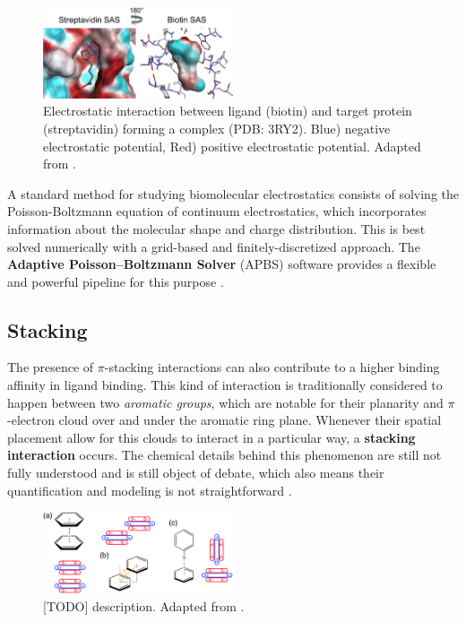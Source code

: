     \begin{figure}[H]
      \centering
      \includegraphics[width=0.5\textwidth]{figures/intro/electrostatics.png}
      \caption{\label{fig:intro/electrostatics} Electrostatic interaction between ligand (biotin) and target protein (streptavidin) forming a complex (PDB: 3RY2). Blue) negative electrostatic potential, Red) positive electrostatic potential. Adapted from \cite{electrostatics_2019}.}
    \end{figure}

    A standard method for studying biomolecular electrostatics consists of solving the Poisson-Boltzmann equation of continuum electrostatics, which incorporates information about the molecular shape and charge distribution. This is best solved numerically with a grid-based and finitely-discretized approach. The \textbf{Adaptive Poisson–Boltzmann Solver} (APBS) software provides a flexible and powerful pipeline for this purpose \cite{apbs_2004, apbs_2018, apbs_web, umol_apbs_2020}.

  \subsection{Stacking}
    The presence of $\pi$-stacking interactions can also contribute to a higher binding affinity in ligand binding. This kind of interaction is traditionally considered to happen between two \textit{aromatic groups}, which are notable for their planarity and $\pi$-electron cloud over and under the aromatic ring plane. Whenever their spatial placement allow for this clouds to interact in a particular way, a \textbf{stacking interaction} occurs. The chemical details behind this phenomenon are still not fully understood and is still object of debate, which also means their quantification and modeling is not straightforward \cite{stacking_binding_2020, stacking_trp_2022, stacking_general_2020}.

    \begin{figure}[H]
      \centering
      \includegraphics[width=0.5\textwidth]{figures/intro/stacking_configs.png}
      \caption{\label{fig:intro/stacking_configs} [TODO] description. Adapted from \cite{stacking_general_2020}.}
    \end{figure}

